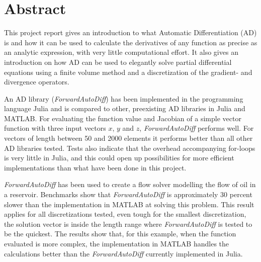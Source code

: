 \chapter*{Abstract}
This project report gives an introduction to what Automatic Differentiation (AD) is and how it can be used to calculate the derivatives of any function as precise as an analytic expression, with very little computational effort. It also gives an introduction on how AD can be used to elegantly solve partial differential equations using a finite volume method and a discretization of the gradient- and divergence operators. 

An AD library (\textit{ForwardAutoDiff}) has been implemented in the programming language Julia and is compared to other, preexisting AD libraries in Julia and MATLAB. For evaluating the function value and Jacobian of a simple vector function with three input vectors $x$, $y$ and $z$, \textit{ForwardAutoDiff} performs well. For vectors of length between 50 and 2000 elements it performs better than all other AD libraries tested. Tests also indicate that the overhead accompanying for-loops is very little in Julia, and this could open up possibilities for more efficient implementations than what have been done in this project.

\textit{ForwardAutoDiff} has been used to create a flow solver modelling the flow of oil in a reservoir. Benchmarks show that \textit{ForwardAutoDiff} is approximately 30 percent slower than the implementation in MATLAB at solving this problem. This result applies for all discretizations tested, even tough for the smallest discretization, the solution vector is inside the length range where \textit{ForwardAutoDiff} is tested to be the quickest. The results show that, for this example, when the function evaluated is more complex, the implementation in MATLAB handles the calculations better than the \textit{ForwardAutoDiff} currently implemented in Julia. 